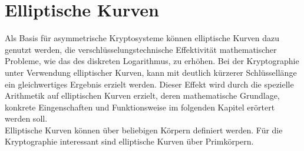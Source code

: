 \chapter{Elliptische Kurven} \label{sec:elliptische_kurve}


Als Basis für asymmetrische Kryptosysteme können elliptische Kurven dazu genutzt werden, die verschlüsselungstechnische Effektivität mathematischer Probleme, wie das des diskreten Logarithmus, zu erhöhen. Bei der Kryptographie unter Verwendung elliptischer Kurven, kann mit deutlich kürzerer Schlüssellänge ein gleichwertiges Ergebnis erzielt werden. Dieser Effekt wird durch die spezielle Arithmetik auf elliptischen Kurven erzielt, deren mathematische Grundlage, konkrete Eingenschaften und Funktionsweise im folgenden Kapitel erörtert werden soll.\\

Elliptische Kurven können über beliebigen Körpern definiert werden. Für die Kryptographie interessant sind elliptische Kurven über Primkörpern.\\





